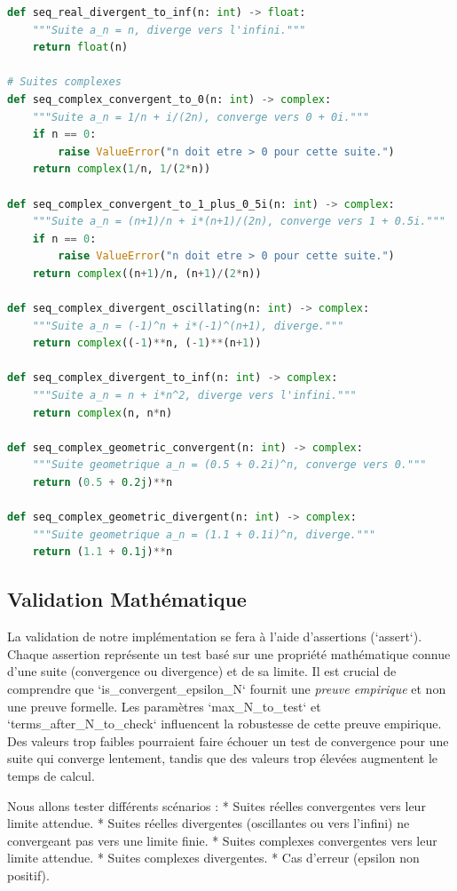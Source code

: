 \documentclass[a4paper,11pt]{report}
\begin{document}
\begin{lstlisting}[language=Python]
def seq_real_divergent_to_inf(n: int) -> float:
    """Suite a_n = n, diverge vers l'infini."""
    return float(n)

# Suites complexes
def seq_complex_convergent_to_0(n: int) -> complex:
    """Suite a_n = 1/n + i/(2n), converge vers 0 + 0i."""
    if n == 0:
        raise ValueError("n doit etre > 0 pour cette suite.")
    return complex(1/n, 1/(2*n))

def seq_complex_convergent_to_1_plus_0_5i(n: int) -> complex:
    """Suite a_n = (n+1)/n + i*(n+1)/(2n), converge vers 1 + 0.5i."""
    if n == 0:
        raise ValueError("n doit etre > 0 pour cette suite.")
    return complex((n+1)/n, (n+1)/(2*n))

def seq_complex_divergent_oscillating(n: int) -> complex:
    """Suite a_n = (-1)^n + i*(-1)^(n+1), diverge."""
    return complex((-1)**n, (-1)**(n+1))

def seq_complex_divergent_to_inf(n: int) -> complex:
    """Suite a_n = n + i*n^2, diverge vers l'infini."""
    return complex(n, n*n)

def seq_complex_geometric_convergent(n: int) -> complex:
    """Suite geometrique a_n = (0.5 + 0.2i)^n, converge vers 0."""
    return (0.5 + 0.2j)**n

def seq_complex_geometric_divergent(n: int) -> complex:
    """Suite geometrique a_n = (1.1 + 0.1i)^n, diverge."""
    return (1.1 + 0.1j)**n

\end{lstlisting}

\subsection*{Validation Mathématique}

La validation de notre implémentation se fera à l'aide d'assertions (`assert`). Chaque assertion représente un test basé sur une propriété mathématique connue d'une suite (convergence ou divergence) et de sa limite. Il est crucial de comprendre que `is\_convergent\_epsilon\_N` fournit une \textit{preuve empirique} et non une preuve formelle. Les paramètres `max\_N\_to\_test` et `terms\_after\_N\_to\_check` influencent la robustesse de cette preuve empirique. Des valeurs trop faibles pourraient faire échouer un test de convergence pour une suite qui converge lentement, tandis que des valeurs trop élevées augmentent le temps de calcul.

Nous allons tester différents scénarios :
*   Suites réelles convergentes vers leur limite attendue.
*   Suites réelles divergentes (oscillantes ou vers l'infini) ne convergeant pas vers une limite finie.
*   Suites complexes convergentes vers leur limite attendue.
*   Suites complexes divergentes.
*   Cas d'erreur (epsilon non positif).
\end{document}
